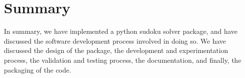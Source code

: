 
\section{Summary}\label{sec:summary}
    In summary, we have implemented a python sudoku solver package, and have discussed the software development process
    involved in doing so.
    We have discussed the design of the package, the development and experimentation process, the validation and
    testing process, the documentation, and finally, the packaging of the code.
